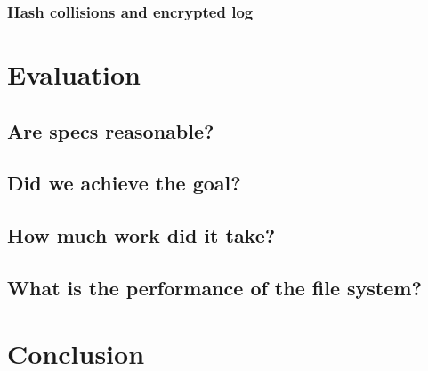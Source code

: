 \documentclass[onecolumn]{paper}
\begin{document}
		\subsubsection{Hash collisions and encrypted log}
\newpage
\section{Evaluation}
        \subsection{Are specs reasonable?}
	\subsection{Did we achieve the goal?}
	\subsection{How much work did it take?}
	\subsection{What is the performance of the file system?}

\section{Conclusion}
\end{document}
